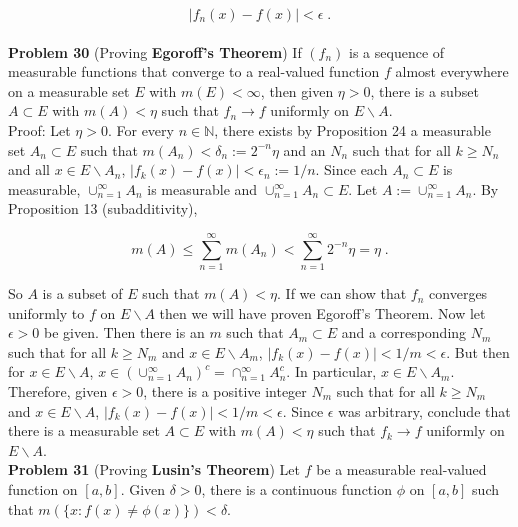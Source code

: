\documentclass[a4paper]{article}
\begin{document}
$$|f_n(x) - f(x)| < \epsilon \;.$$\\


{\bf Problem 30} (Proving {\bf Egoroff's Theorem}) If $(f_n)$ is a sequence of measurable functions that converge to a real-valued function $f$ almost everywhere on a measurable set $E$ with $m(E) < \infty$, then given $\eta > 0$, there is a subset $A \subset E$ with $m(A) < \eta$ such that $f_n \rightarrow f$ uniformly on $E\backslash A$. \\

Proof:  Let $\eta > 0$. For every $n \in \mathbb{N}$, there exists by Proposition 24 a measurable set $A_n \subset E$ such that $m(A_n) < \delta_n:= 2^{-n}\eta$ and an $N_n$ such that for all $k \geq N_n$ and all $x \in E\backslash A_n$, $|f_k(x) - f(x)| < \epsilon_n := 1/n$. Since each $A_n\subset E$ is measurable, $\cup_{n=1}^\infty A_n$ is measurable and $\cup_{n=1}^\infty A_n \subset E$. Let $A:= \cup_{n=1}^\infty A_n$. By Proposition 13 (subadditivity), 

$$m(A) \leq \sum_{n=1}^\infty m(A_n) < \sum_{n=1}^\infty 2^{-n}\eta = \eta \;.$$

So $A$ is a subset of $E$ such that $m(A) < \eta$. If we can show that $f_n$ converges uniformly to $f$ on $E \backslash A$ then we will have proven Egoroff's Theorem. Now let $\epsilon > 0$ be given. Then there is an $m$ such that $A_m \subset E$ and a corresponding $N_m$ such that for all $k\geq N_m$ and $x \in E\backslash A_m$, $|f_k(x) - f(x)| < 1/m < \epsilon$. But then for $x \in E\backslash A$, $x \in \left(\cup_{n=1}^\infty A_n\right)^c = \cap_{n=1}^\infty A_n^c$. In particular, $x \in E\backslash A_m$. Therefore, given $\epsilon > 0$, there is a positive integer $N_m$ such that for all $k\geq N_m$ and $x \in E\backslash A$, $|f_k(x) - f(x)| < 1/m < \epsilon$. Since $\epsilon$ was arbitrary, conclude that there is a measurable set $A\subset E$ with $m(A) < \eta$ such that $f_k \rightarrow f$ uniformly on $E\backslash A$.\\

{\bf Problem 31} (Proving {\bf Lusin's Theorem}) Let $f$ be a measurable real-valued function on $[a,b]$. Given $\delta > 0$, there is a continuous function $\phi$ on $[a,b]$ such that $m(\{x : f(x) \neq \phi(x)\}) < \delta$. \\
\end{document}
